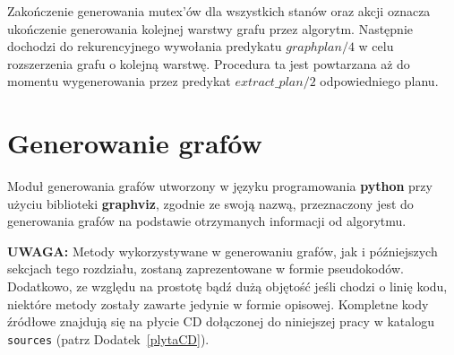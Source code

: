     Zakończenie generowania mutex'ów dla wszystkich stanów oraz akcji oznacza ukończenie generowania kolejnej warstwy grafu przez algorytm. 
    Następnie dochodzi do rekurencyjnego wywołania predykatu $graphplan/4$ w celu rozszerzenia grafu o kolejną warstwę. Procedura ta 
    jest powtarzana aż do momentu wygenerowania przez predykat $extract\_plan/2$ odpowiedniego planu.


\section{Generowanie grafów}
    Moduł generowania grafów utworzony w języku programowania \textbf{python} przy użyciu biblioteki \textbf{graphviz}, zgodnie ze swoją nazwą,
    przeznaczony jest do generowania grafów na podstawie otrzymanych informacji od algorytmu.

    \textbf{UWAGA:} Metody wykorzystywane w generowaniu grafów, jak i późniejszych sekcjach tego rozdziału, zostaną zaprezentowane w formie pseudokodów.
    Dodatkowo, ze względu na prostotę bądź dużą objętość jeśli chodzi o linię kodu, niektóre metody zostały zawarte jedynie w formie opisowej.  
    Kompletne kody źródłowe znajdują się na płycie CD dołączonej do niniejszej pracy w katalogu \texttt{sources} (patrz Dodatek~\ref{plytaCD}).
